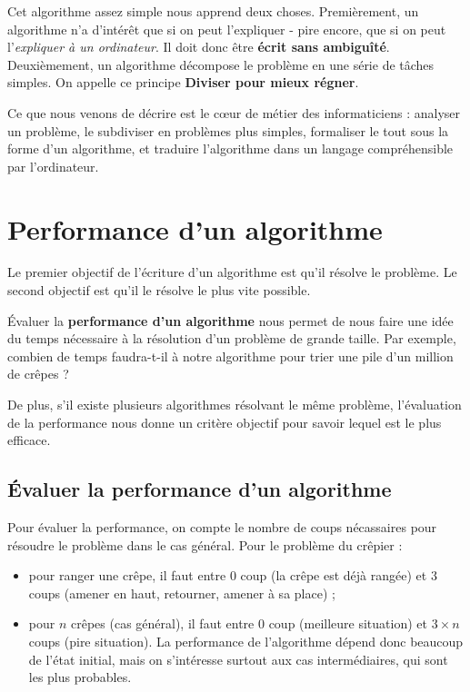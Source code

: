 \documentclass[a5paper,pagesize,DIV=14]{scrbook}
\begin{document}
Cet algorithme assez simple nous apprend deux choses. Premièrement, un algorithme n'a d'intérêt que si on peut l'expliquer - pire encore, que si on peut l'\textit{expliquer à un ordinateur}. Il doit donc être \textbf{écrit sans ambiguîté}. Deuxièmement, un algorithme décompose le problème en une série de tâches simples. On appelle ce principe \textbf{\og Diviser pour mieux régner\fg}.

Ce que nous venons de décrire est le c\oe{}ur de métier des informaticiens : analyser un problème, le subdiviser en problèmes plus simples, formaliser le tout sous la forme d'un algorithme, et traduire l'algorithme dans un langage compréhensible par l'ordinateur.

\section*{Performance d'un algorithme}

Le premier objectif de l'écriture d'un algorithme est qu'il résolve le problème. Le second objectif est qu'il le résolve le plus vite possible. 

Évaluer la \textbf{performance d'un algorithme} nous permet de nous faire une idée du temps nécessaire à la résolution d'un problème de grande taille. Par exemple, combien de temps faudra-t-il à notre algorithme pour trier une pile d'un million de crêpes ?

De plus, s'il existe plusieurs algorithmes résolvant le même problème, l'évaluation de la performance nous donne un critère objectif pour savoir lequel est le plus efficace.

\subsection*{Évaluer la performance d'un algorithme}

Pour évaluer la performance, on compte le nombre de \og coups \fg nécassaires pour résoudre le problème dans le cas général. Pour le problème du crêpier :

\begin{itemize}
  \item pour ranger une crêpe, il faut entre $0$ coup (la crêpe est déjà rangée) et $3$ coups (amener en haut, retourner, amener à sa place) ;
  \item pour $n$ crêpes (cas général), il faut entre $0$ coup (meilleure situation) et $3 \times n$ coups (pire situation). La performance de l'algorithme dépend donc beaucoup de l'état initial, mais on s'intéresse surtout aux cas intermédiaires, qui sont les plus probables.
\end{itemize}
\end{document}
